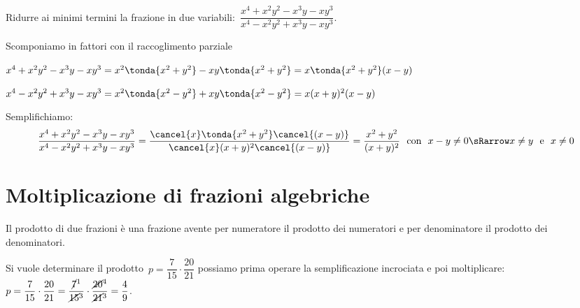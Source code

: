  \begin{esempio}
Ridurre ai minimi termini la frazione in due 
variabili:~\(\dfrac{x^{4}+x^{2}y^{2}-x^{3}y-xy^{3}}
                   {x^{4}-x^{2}y^{2}+x^{3}y-xy^{3}}\).
\begin{itemize*}
 \item Scomponiamo in fattori con il raccoglimento parziale
  \begin{itemize*}
  \item \(x^{4}+x^{2}y^{2}-x^{3}y-xy^{3}=
   x^{2}  \tonda{x^{2}+y^{2}} -xy  \tonda{x^{2}+y^{2}} =
   x  \tonda{x^{2}+y^{2}}  (x-y)\)
  \item \(x^{4}-x^{2}y^{2}+x^{3}y-xy^{3}=
   x^{2}  \tonda{x^{2}-y^{2}} +xy  \tonda{x^{2}-y^{2}} =
   x (x+y)^{2} (x-y)\)
  \end{itemize*}
 \item Semplifichiamo:
\[\dfrac{x^{4}+x^{2}y^{2}-x^{3}y-xy^{3}}
        {x^{4}-x^{2}y^{2}+x^{3}y-xy^{3}}=
  \dfrac{\cancel{x}  \tonda{x^{2}+y^{2}}  \cancel{(x-y)}}
        {\cancel{x}(x+y)^{2} \cancel{(x-y)}}=\dfrac{x^2+y^2}{(x+y)^2} 
  \stext{con} x-y \neq 0 \sRarrow x \neq y \stext{e} x \neq 0\]
\end{itemize*}
 \end{esempio}



\section{Moltiplicazione di frazioni algebriche}
\label{sec:frazalg_moltiplicazione}

Il prodotto di due frazioni è una frazione avente per numeratore il prodotto 
dei numeratori e per denominatore il prodotto dei denominatori.

Si vuole determinare il prodotto~\(p=\dfrac{7}{15}\cdot \dfrac{20}{21}\) 
possiamo 
prima operare la semplificazione incrociata e poi
moltiplicare:~\(p=\dfrac{7}{15}\cdot \dfrac{20}{21}=
\dfrac{\cancel{7}^1}{\cancel{15}^3}\cdot \dfrac{\cancel{20}^4}{\cancel{21}^3}=
\dfrac{4}{9}\).

